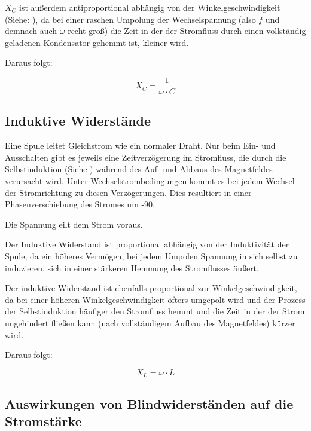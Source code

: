 $X_C$ ist außerdem antiproportional abhängig von der Winkelgeschwindigkeit (Siehe: ), da bei einer raschen Umpolung der Wechselspannung (also $f$ und demnach auch $\omega$ recht groß) die Zeit in der der Stromfluss durch einen vollständig geladenen Kondensator gehemmt ist, kleiner wird.

Daraus folgt:

\begin{equation}	\label{eq:KapazitiverWiderstand}
	X_C = \frac{1}{\omega \cdot C}
\end{equation}


\subsection{Induktive Widerstände}		\label{subsec:InduktiverWiderstand}

Eine Spule leitet Gleichstrom wie ein normaler Draht. Nur beim Ein- und Ausschalten gibt es jeweils eine Zeitverzögerung im Stromfluss, die durch die Selbstinduktion (Siehe ) während des Auf- und Abbaus des Magnetfeldes verursacht wird. Unter Wechselstrombedingungen kommt es bei jedem Wechsel der Stromrichtung zu diesen Verzögerungen. Dies resultiert in einer Phasenverschiebung des Stromes um -90\degree .

\glqq Die Spannung eilt dem Strom voraus.\grqq

\vspace{11pt}

Der \glqq Induktive Widerstand\grqq{} ist proportional abhängig von der Induktivität der Spule, da ein höheres Vermögen, bei jedem Umpolen Spannung in sich selbst zu induzieren, sich in einer stärkeren Hemmung des Stromflusses äußert.

Der induktive Widerstand ist ebenfalls proportional zur Winkelgeschwindigkeit, da bei einer höheren Winkelgeschwindigkeit öfters umgepolt wird und der Prozess der Selbstinduktion häufiger den Stromfluss hemmt und die Zeit in der der Strom ungehindert fließen kann (nach vollständigem Aufbau des Magnetfeldes) kürzer wird.

Daraus folgt:

\begin{equation}	\label{eq:InduktiverWiderstand}
	X_L = \omega \cdot  L
\end{equation}


\subsection{Auswirkungen von Blindwiderständen auf die Stromstärke} \label{subsec:AuswirkungenWiderstand}

